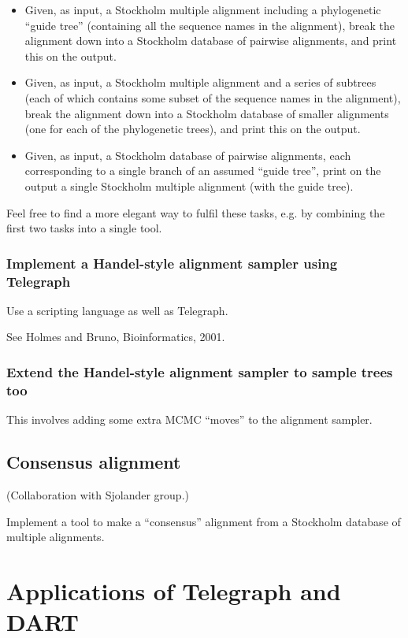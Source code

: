 \documentclass{article}
\begin{document}
\begin{itemize}
\item Given, as input, a Stockholm multiple alignment
including a phylogenetic ``guide tree''
 (containing all the sequence names in the alignment),
break the alignment down into a Stockholm database of pairwise alignments,
and print this on the output.
\item Given, as input, a Stockholm multiple alignment
and a series of subtrees (each of which contains some
subset of the sequence names in the alignment),
break the alignment down into a Stockholm database of smaller alignments
(one for each of the phylogenetic trees),
and print this on the output.
\item Given, as input, a Stockholm database of pairwise alignments,
each corresponding to a single branch of an assumed ``guide tree'',
print on the output a single Stockholm multiple alignment
(with the guide tree).
\end{itemize}

Feel free to find a more elegant way to fulfil these tasks,
e.g. by combining the first two tasks into a single tool.

\subsubsection{Implement a Handel-style alignment sampler using Telegraph}

Use a scripting language as well as Telegraph.

See Holmes and Bruno, Bioinformatics, 2001.

\subsubsection{Extend the Handel-style alignment sampler to sample trees too}

This involves adding some extra MCMC ``moves'' to the alignment sampler.

\subsection{Consensus alignment}

(Collaboration with Sjolander group.)

Implement a tool to make a ``consensus'' alignment from a
Stockholm database of multiple alignments.


\section{Applications of Telegraph and DART}
\end{document}
